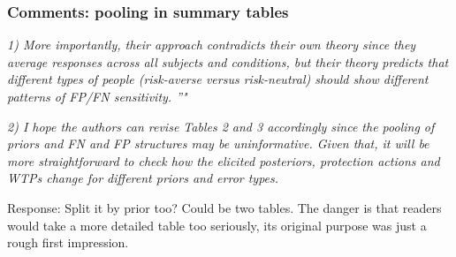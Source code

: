 \documentclass[11pt,hyperref={bookmarks=false}]{beamer}
\begin{document}
\begin{frame}
\frametitle{Comments: pooling in summary tables}
\footnotesize
\parbox{\textwidth}{

\textit{1) More importantly, their
approach contradicts their own theory since they average responses across all subjects
and conditions, but their theory predicts that different types of people (risk-averse versus
risk-neutral) should show different patterns of FP/FN sensitivity. ”"}
}
\par
\textit{2) I hope the authors can revise Tables 2 and 3 accordingly since the pooling of priors and
FN and FP structures may be uninformative. Given that, it will be more straightforward to
check how the elicited posteriors, protection actions and WTPs change for different priors
and error types.}

\parbox{\textwidth}{
Response: Split it by prior too? Could be two tables. The danger is that readers would take a more detailed table too seriously, its original purpose was just a rough first impression. 
}


\end{frame}
\end{document}
